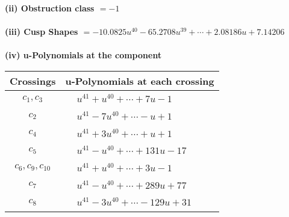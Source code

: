 \documentclass[1p]{elsarticle_modified}
\theoremstyle{definition}
\begin{document}
\flushleft \textbf{(ii) Obstruction class $= -1$}\\~\\
\flushleft \textbf{(iii) Cusp Shapes $= -10.0825 u^{40}-65.2708 u^{39}+\cdots+2.08186 u+7.14206$}\\~\\
\newpage\renewcommand{\arraystretch}{1}
\flushleft \textbf{(iv) u-Polynomials at the component}\newline \\
\begin{tabular}{m{50pt}|m{274pt}}
Crossings & \hspace{64pt}u-Polynomials at each crossing \\
\hline $$\begin{aligned}c_{1},c_{3}\end{aligned}$$&$\begin{aligned}
&u^{41}+u^{40}+\cdots+7 u-1
\end{aligned}$\\
\hline $$\begin{aligned}c_{2}\end{aligned}$$&$\begin{aligned}
&u^{41}-7 u^{40}+\cdots- u+1
\end{aligned}$\\
\hline $$\begin{aligned}c_{4}\end{aligned}$$&$\begin{aligned}
&u^{41}+3 u^{40}+\cdots+u+1
\end{aligned}$\\
\hline $$\begin{aligned}c_{5}\end{aligned}$$&$\begin{aligned}
&u^{41}- u^{40}+\cdots+131 u-17
\end{aligned}$\\
\hline $$\begin{aligned}c_{6},c_{9},c_{10}\end{aligned}$$&$\begin{aligned}
&u^{41}+u^{40}+\cdots+3 u-1
\end{aligned}$\\
\hline $$\begin{aligned}c_{7}\end{aligned}$$&$\begin{aligned}
&u^{41}- u^{40}+\cdots+289 u+77
\end{aligned}$\\
\hline $$\begin{aligned}c_{8}\end{aligned}$$&$\begin{aligned}
&u^{41}-3 u^{40}+\cdots-129 u+31
\end{aligned}$\\
\hline
\end{tabular}\\~\\
\end{document}
